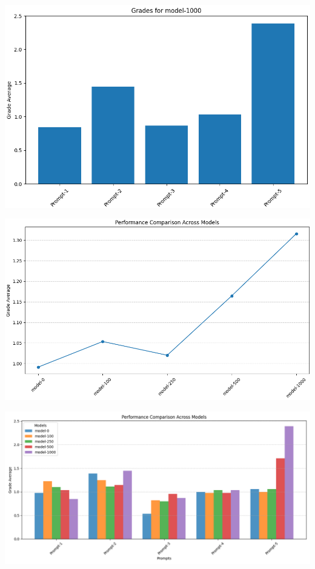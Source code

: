 \documentclass[12pt]{article}
\begin{document}
\begin{center}
    \begin{minipage}{0.49\textwidth}
        \centering
        \includegraphics[width=\textwidth]{img/plots/model-1000-grades.png}
    \end{minipage} 
    \hfill
    \begin{minipage}{0.49\textwidth}
        \centering
        \includegraphics[width=\textwidth]{img/plots/mean-performance-comparison.png}
    \end{minipage}

    \vspace{2em}

    \begin{center}
        \includegraphics[width=1\textwidth]{img/plots/performance-comparison.png}
    \end{center}
\end{center}
\end{document}
